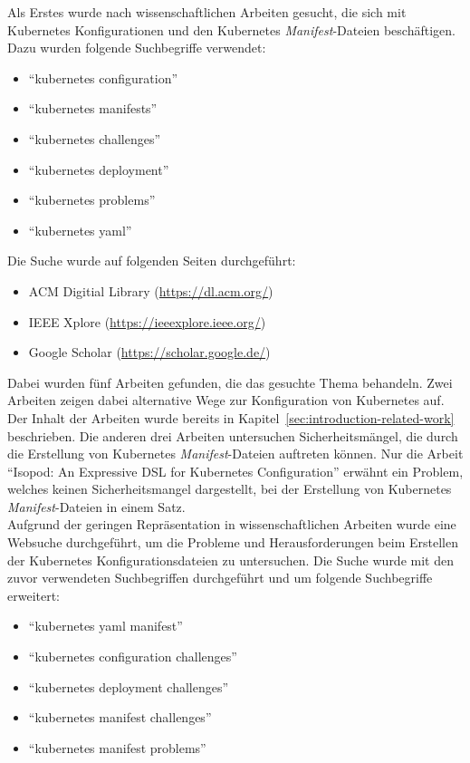 Als Erstes wurde nach wissenschaftlichen Arbeiten gesucht, die sich mit Kubernetes Konfigurationen und den Kubernetes \textit{Manifest}-Dateien
beschäftigen. Dazu wurden folgende Suchbegriffe verwendet:
\begin{itemize}
    \setlength\itemsep{-0.5cm}
    \item ``kubernetes configuration''
    \item ``kubernetes manifests''
    \item ``kubernetes challenges''
    \item ``kubernetes deployment''
    \item ``kubernetes problems''
    \item ``kubernetes yaml''
\end{itemize}
Die Suche wurde auf folgenden Seiten durchgeführt:
\begin{itemize}
    \setlength\itemsep{-0.5cm}
    \item ACM Digitial Library (\url{https://dl.acm.org/})
    \item IEEE Xplore (\url{https://ieeexplore.ieee.org/})
    \item Google Scholar (\url{https://scholar.google.de/})
\end{itemize}
Dabei wurden fünf Arbeiten gefunden, die das gesuchte Thema behandeln. Zwei Arbeiten zeigen dabei alternative Wege zur Konfiguration von Kubernetes auf.
Der Inhalt der Arbeiten wurde bereits in Kapitel~\ref{sec:introduction-related-work} beschrieben. Die anderen drei Arbeiten untersuchen Sicherheitsmängel,
die durch die Erstellung von Kubernetes \textit{Manifest}-Dateien auftreten können.
Nur die Arbeit ``Isopod: An Expressive DSL for Kubernetes Configuration'' erwähnt ein Problem, welches keinen Sicherheitsmangel dargestellt, bei der Erstellung von Kubernetes \textit{Manifest}-Dateien
in einem Satz.
\\
Aufgrund der geringen Repräsentation in wissenschaftlichen Arbeiten wurde eine Websuche durchgeführt, um die Probleme und Herausforderungen beim Erstellen
der Kubernetes Konfigurationsdateien zu untersuchen.
Die Suche wurde mit den zuvor verwendeten Suchbegriffen durchgeführt und um folgende Suchbegriffe erweitert:
\begin{itemize}
    \setlength\itemsep{-0.5cm}
    \item ``kubernetes yaml manifest''
    \item ``kubernetes configuration challenges''
    \item ``kubernetes deployment challenges''
    \item ``kubernetes manifest challenges''
    \item ``kubernetes manifest problems''
\end{itemize}
